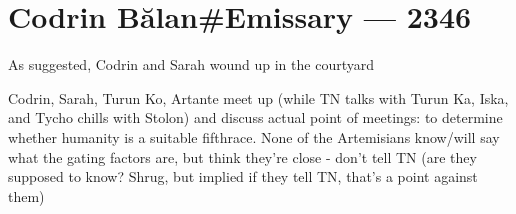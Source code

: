 \hypertarget{codrin-bux103lanemissary-2346}{%
\chapter{Codrin Bălan\#Emissary — 2346}\label{codrin-bux103lanemissary-2346}}

As suggested, Codrin and Sarah wound up in the courtyard

Codrin, Sarah, Turun Ko, Artante meet up (while TN talks with Turun Ka, Iska, and Tycho chills with Stolon) and discuss actual point of meetings: to determine whether humanity is a suitable fifthrace. None of the Artemisians know/will say what the gating factors are, but think they're close - don't tell TN (are they supposed to know? Shrug, but implied if they tell TN, that's a point against them)
